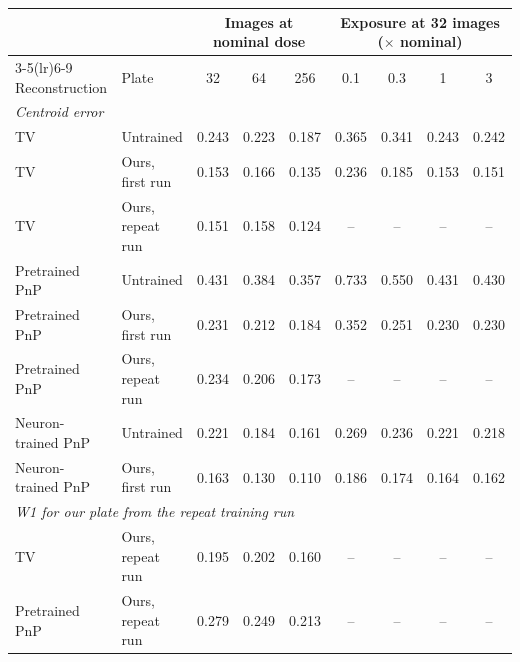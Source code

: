 \begin{tabular}{@{}llccccccc@{}}
\toprule
& & \multicolumn{3}{c}{Images at nominal dose} & \multicolumn{4}{c}{Exposure at 32 images ($\times$ nominal)} \\
\cmidrule(lr){3-5}\cmidrule(lr){6-9}
Reconstruction & Plate & 32 & 64 & 256 & 0.1 & 0.3 & 1 & 3\\
\midrule
\multicolumn{9}{l}{\textit{Centroid error}}\\
TV & Untrained & 0.243 & 0.223 & 0.187 & 0.365 & 0.341 & 0.243 & 0.242\\
TV & Ours, first run & 0.153 & 0.166 & 0.135 & 0.236 & 0.185 & 0.153 & 0.151\\
TV & Ours, repeat run & 0.151 & 0.158 & 0.124 & -- & -- & -- & --\\
Pretrained PnP & Untrained & 0.431 & 0.384 & 0.357 & 0.733 & 0.550 & 0.431 & 0.430\\
Pretrained PnP & Ours, first run & 0.231 & 0.212 & 0.184 & 0.352 & 0.251 & 0.230 & 0.230\\
Pretrained PnP & Ours, repeat run & 0.234 & 0.206 & 0.173 & -- & -- & -- & --\\
Neuron-trained PnP & Untrained & 0.221 & 0.184 & 0.161 & 0.269 & 0.236 & 0.221 & 0.218\\
Neuron-trained PnP & Ours, first run & 0.163 & 0.130 & 0.110 & 0.186 & 0.174 & 0.164 & 0.162\\
\multicolumn{9}{l}{\textit{W1 for our plate from the repeat training run}}\\
TV & Ours, repeat run & 0.195 & 0.202 & 0.160 & -- & -- & -- & --\\
Pretrained PnP & Ours, repeat run & 0.279 & 0.249 & 0.213 & -- & -- & -- & --\\
\bottomrule
\end{tabular}
